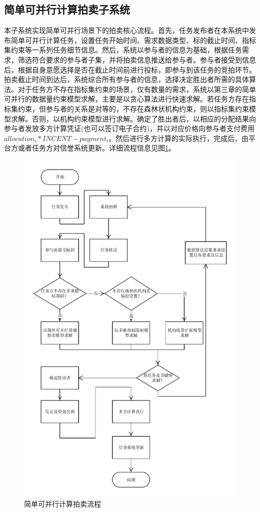 \documentclass[promaster]{thesis-uestc}
\begin{document}
\subsection{简单可并行计算拍卖子系统}
本子系统实现简单可并行场景下的拍卖核心流程。首先，任务发布者在本系统中发布简单可并行计算任务，设置任务开始时间、需求数据类型、标的截止时间、指标集约束等一系列任务细节信息。然后，系统以参与者的信息为基础，根据任务需求，筛选符合要求的参与者子集，并将拍卖信息推送给参与者。参与者接受到信息后，根据自身意愿选择是否在截止时间前进行投标，即参与到该任务的竞拍环节。拍卖截止时间到达后，系统综合所有参与者的信息，选择决定胜出者所需的具体算法。对于任务方不存在指标集约束的场景，仅有数量的需求，系统以第三章的简单可并行的数据量约束模型求解，主要是以贪心算法进行快速求解。若任务方存在指标集约束，但参与者的关系是对等的，不存在森林状机构约束，则以指标集约束模型求解。否则，以机构约束模型进行求解。确定了胜出者后，以相应的分配结果向参与者发放多方计算凭证(也可以签订电子合约)，并以对应价格向参与者支付费用$allocation_i*INCENT-payment_i$。然后进行多方计算的实际执行，完成后，由平台方或者任务方对信誉系统更新。详细流程信息见图\ref{jiandanliucheng}。

\begin{figure}[p]
    \includegraphics[width=350pt]{pic/kebingxing.pdf}
    \caption{简单可并行计算拍卖流程}
    \label{jiandanliucheng}
\end{figure}
\end{document}
